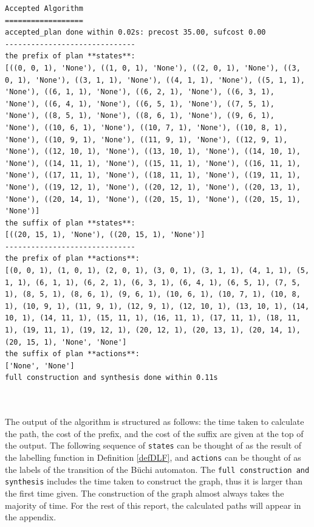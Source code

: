 \begin{minipage}{\textwidth}
\begingroup
\fontsize{9pt}{12pt}\selectfont
\begin{lstlisting}
Accepted Algorithm
==================
accepted_plan done within 0.02s: precost 35.00, sufcost 0.00
------------------------------
the prefix of plan **states**:
[((0, 0, 1), 'None'), ((1, 0, 1), 'None'), ((2, 0, 1), 'None'), ((3, 0, 1), 'None'), ((3, 1, 1), 'None'), ((4, 1, 1), 'None'), ((5, 1, 1), 'None'), ((6, 1, 1), 'None'), ((6, 2, 1), 'None'), ((6, 3, 1), 'None'), ((6, 4, 1), 'None'), ((6, 5, 1), 'None'), ((7, 5, 1), 'None'), ((8, 5, 1), 'None'), ((8, 6, 1), 'None'), ((9, 6, 1), 'None'), ((10, 6, 1), 'None'), ((10, 7, 1), 'None'), ((10, 8, 1), 'None'), ((10, 9, 1), 'None'), ((11, 9, 1), 'None'), ((12, 9, 1), 'None'), ((12, 10, 1), 'None'), ((13, 10, 1), 'None'), ((14, 10, 1), 'None'), ((14, 11, 1), 'None'), ((15, 11, 1), 'None'), ((16, 11, 1), 'None'), ((17, 11, 1), 'None'), ((18, 11, 1), 'None'), ((19, 11, 1), 'None'), ((19, 12, 1), 'None'), ((20, 12, 1), 'None'), ((20, 13, 1), 'None'), ((20, 14, 1), 'None'), ((20, 15, 1), 'None'), ((20, 15, 1), 'None')]
the suffix of plan **states**:
[((20, 15, 1), 'None'), ((20, 15, 1), 'None')]
------------------------------
the prefix of plan **actions**:
[(0, 0, 1), (1, 0, 1), (2, 0, 1), (3, 0, 1), (3, 1, 1), (4, 1, 1), (5, 1, 1), (6, 1, 1), (6, 2, 1), (6, 3, 1), (6, 4, 1), (6, 5, 1), (7, 5, 1), (8, 5, 1), (8, 6, 1), (9, 6, 1), (10, 6, 1), (10, 7, 1), (10, 8, 1), (10, 9, 1), (11, 9, 1), (12, 9, 1), (12, 10, 1), (13, 10, 1), (14, 10, 1), (14, 11, 1), (15, 11, 1), (16, 11, 1), (17, 11, 1), (18, 11, 1), (19, 11, 1), (19, 12, 1), (20, 12, 1), (20, 13, 1), (20, 14, 1), (20, 15, 1), 'None', 'None']
the suffix of plan **actions**:
['None', 'None']
full construction and synthesis done within 0.11s
\end{lstlisting}
\endgroup
\end{minipage} \\ \\


The output of the algorithm is structured as follows: the time taken to calculate the path, the cost of the prefix, and the cost of the suffix are given at the top of the output. The following sequence of \texttt{states} can be thought of as the result of the labelling function in Definition \ref{defDLF}, and \texttt{actions} can be thought of as the labels of the transition of the B\"uchi automaton. The \texttt{full construction and synthesis} includes the time taken to construct the graph, thus it is larger than the first time given. The construction of the graph almost always takes the majority of time. For the rest of this report, the calculated paths will appear in the appendix.

